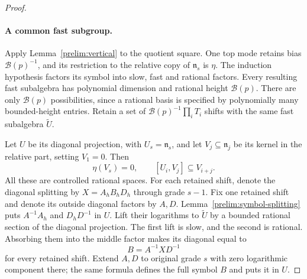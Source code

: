 \begin{proof}
\paragraph{A common fast subgroup.}
Apply Lemma~\ref{prelim:vertical} to the quotient square.  One
top mode retains bias $\mathcal B(p)^{-1}$, and its restriction
to the relative copy of $\mathfrak n_s$ is $\eta$.
The induction hypothesis factors its symbol into slow, fast and
rational factors.  Every resulting fast subalgebra has polynomial
dimension and rational height $\mathcal B(p)$.  There are only
$\mathcal B(p)$ possibilities, since a rational basis is specified
by polynomially many bounded-height entries.  Retain a set of
$\mathcal B(p)^{-1}\prod_iT_i$ shifts with the same fast
subalgebra $\widetilde U$.

Let $U$ be its diagonal projection, with $U_s=\mathfrak n_s$,
and let $V_j\subseteq\mathfrak n_j$ be its kernel in the
relative part, setting $V_1=0$.  Then
\begin{equation}\label{prelim:UV}
 \eta(V_s)=0,\qquad [U_i,V_j]\subseteq V_{i+j}.
\end{equation}
All these are controlled rational spaces.  For each retained
shift, denote the diagonal splitting by $X=A_hB_hD_h$ through
grade $s-1$.  Fix one retained shift and denote its outside
diagonal factors by $A,D$.  Lemma~\ref{prelim:symbol-splitting}
puts $A^{-1}A_h$ and $D_hD^{-1}$ in $U$.  Lift their logarithms
to $\widetilde U$ by a bounded rational section of the diagonal
projection.  The first lift is slow, and the second is rational.
Absorbing them into the middle factor makes its diagonal equal to
\[
 B=A^{-1}XD^{-1}
\]
for every retained shift.  Extend $A,D$ to original grade $s$
with zero logarithmic component there; the same formula defines
the full symbol $B$ and puts it in $U$.


\end{proof}
